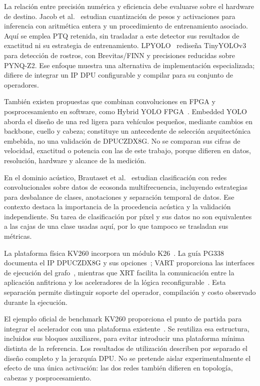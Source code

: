 \documentclass[10pt,conference,a4paper]{elektron}
\begin{document}
La relación entre precisión numérica y eficiencia debe evaluarse sobre el hardware de destino. Jacob et al.~\cite{jacob2018} estudian cuantización de pesos y activaciones para inferencia con aritmética entera y un procedimiento de entrenamiento asociado. Aquí se emplea PTQ retenida, sin trasladar a este detector sus resultados de exactitud ni su estrategia de entrenamiento. LPYOLO~\cite{lpyolo} rediseña TinyYOLOv3 para detección de rostros, con Brevitas/FINN y precisiones reducidas sobre PYNQ-Z2. Ese enfoque muestra una alternativa de implementación especializada; difiere de integrar un IP DPU configurable y compilar para su conjunto de operadores.

También existen propuestas que combinan convoluciones en FPGA y posprocesamiento en software, como Hybrid YOLO FPGA~\cite{hybridyolo}. Embedded YOLO~\cite{embeddedyolo} aborda el diseño de una red ligera para vehículos pequeños, mediante cambios en backbone, cuello y cabeza; constituye un antecedente de selección arquitectónica embebida, no una validación de DPUCZDX8G. No se comparan sus cifras de velocidad, exactitud o potencia con las de este trabajo, porque difieren en datos, resolución, hardware y alcance de la medición.

En el dominio acústico, Brautaset et al.~\cite{brautaset2020} estudian clasificación con redes convolucionales sobre datos de ecosonda multifrecuencia, incluyendo estrategias para desbalance de clases, anotaciones y separación temporal de datos. Ese contexto destaca la importancia de la procedencia acústica y la validación independiente. Su tarea de clasificación por píxel y sus datos no son equivalentes a las cajas de una clase usadas aquí, por lo que tampoco se trasladan sus métricas.

La plataforma física KV260 incorpora un módulo K26~\cite{kv260}. La guía PG338 documenta el IP DPUCZDX8G y sus opciones~\cite{dpuguide}; VART proporciona las interfaces de ejecución del grafo~\cite{vart}, mientras que XRT facilita la comunicación entre la aplicación anfitriona y los aceleradores de la lógica reconfigurable~\cite{xrt}. Esta separación permite distinguir soporte del operador, compilación y costo observado durante la ejecución.

El ejemplo oficial de benchmark KV260 proporciona el punto de partida para integrar el acelerador con una plataforma existente~\cite{kria}. Se reutiliza esa estructura, incluidos sus bloques auxiliares, para evitar introducir una plataforma mínima distinta de la referencia. Los resultados de utilización describen por separado el diseño completo y la jerarquía DPU. No se pretende aislar experimentalmente el efecto de una única activación: las dos redes también difieren en topología, cabezas y posprocesamiento.
\end{document}
